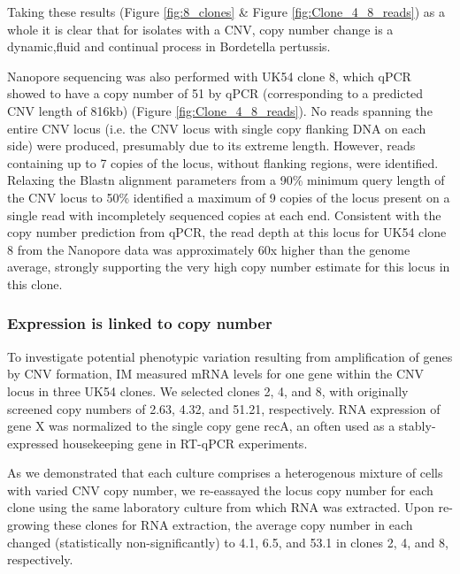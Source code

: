 \documentclass{article}
\begin{document}

Taking these results (Figure \ref{fig:8_clones} \& Figure \ref{fig:Clone_4_8_reads}) as a whole it is clear that for isolates with a CNV, copy number change is a dynamic,fluid and continual process in Bordetella pertussis.

Nanopore sequencing was also performed with UK54 clone 8, which qPCR showed to have  a copy number of 51 by qPCR (corresponding to a predicted CNV length of 816kb) (Figure \ref{fig:Clone_4_8_reads}). No reads spanning the entire CNV locus (i.e. the CNV locus with single copy flanking DNA on each side) were produced, presumably due to its extreme length. However, reads containing up to 7 copies of the locus, without flanking regions, were identified. Relaxing the Blastn alignment parameters from a 90\% minimum query length of the CNV locus to 50\% identified a maximum of 9 copies of the locus present on a single read with incompletely sequenced copies at each end. Consistent with the copy number prediction from qPCR, the read depth at this locus for UK54 clone 8 from the Nanopore data was approximately 60x higher than the genome average, strongly supporting the very high copy number estimate for this locus in this clone.

\subsubsection{Expression is linked to copy number}

To investigate potential phenotypic variation resulting from amplification of genes by CNV formation, IM measured mRNA levels for one gene within the CNV locus in three UK54 clones. We selected clones 2, 4, and 8, with originally screened copy numbers of 2.63, 4.32, and 51.21, respectively. RNA expression of gene X was normalized to the single copy gene recA, an often used as a stably-expressed housekeeping gene in RT-qPCR experiments.

As we demonstrated that each culture comprises a heterogenous mixture of cells with varied CNV copy number, we re-eassayed the locus copy number for each clone using the same laboratory culture from which RNA was extracted. Upon re-growing these clones for RNA extraction, the average copy number in each changed (statistically non-significantly) to 4.1, 6.5, and 53.1 in clones 2, 4, and 8, respectively.
\end{document}
